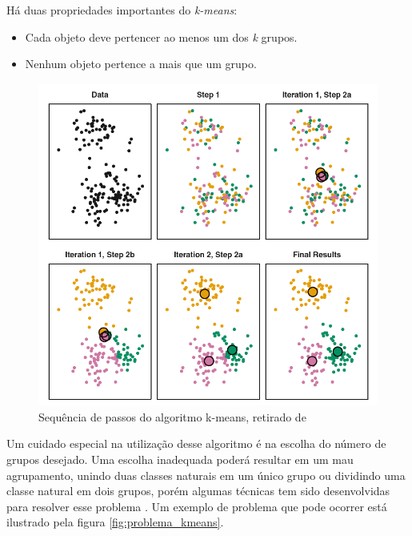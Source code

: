 \documentclass[a4paper,12pt]{article}
\begin{document}
Há duas propriedades importantes do \textit{k-means}:

\begin{itemize}
\item Cada objeto deve pertencer ao menos um dos \textit{k} grupos.
\item Nenhum objeto pertence a mais que um grupo.
\end{itemize}

\begin{figure}[H]
    \begin{center}
        \includegraphics[scale=0.65]{k_means_algorithm.png}
    \end{center}
    \caption{Sequência de passos do algoritmo k-means, retirado de \cite{experiment_clustering}}
    \label{fig:passos_kmeans}
\end{figure}

Um cuidado especial na utilização desse algoritmo é na escolha do número de grupos desejado. Uma escolha inadequada poderá resultar em um mau agrupamento, unindo duas classes naturais em um único grupo ou dividindo uma classe natural em dois grupos, porém algumas técnicas tem sido desenvolvidas para resolver esse problema \cite{Jain99, Manning09}. Um exemplo de problema que pode ocorrer está ilustrado pela figura \ref{fig:problema_kmeans}.
\end{document}
